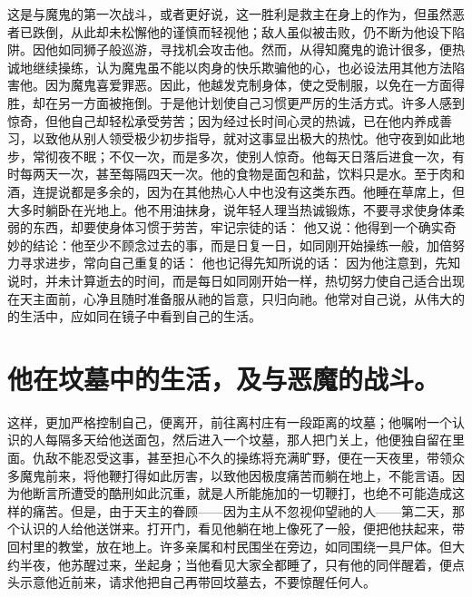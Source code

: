 这是与魔鬼的第一次战斗，或者更好说，这一胜利是救主在身上的作为，但虽然恶者已跌倒，从此却未松懈他的谨慎而轻视他；敌人虽似被击败，仍不断为他设下陷阱。因他如同狮子般巡游，寻找机会攻击他。然而，从得知魔鬼的诡计很多，便热诚地继续操练，认为魔鬼虽不能以肉身的快乐欺骗他的心，也必设法用其他方法陷害他。因为魔鬼喜爱罪恶。因此，他越发克制身体，使之受制服，以免在一方面得胜，却在另一方面被拖倒。于是他计划使自己习惯更严厉的生活方式。许多人感到惊奇，但他自己却轻松承受劳苦；因为经过长时间心灵的热诚，已在他内养成善习，以致他从别人领受极少初步指导，就对这事显出极大的热忱。他守夜到如此地步，常彻夜不眠；不仅一次，而是多次，使别人惊奇。他每天日落后进食一次，有时每两天一次，甚至每隔四天一次。他的食物是面包和盐，饮料只是水。至于肉和酒，连提说都是多余的，因为在其他热心人中也没有这类东西。他睡在草席上，但大多时躺卧在光地上。他不用油抹身，说年轻人理当热诚锻炼，不要寻求使身体柔弱的东西，却要使身体习惯于劳苦，牢记宗徒的话： 他又说：他得到一个确实奇妙的结论：他至少不顾念过去的事，而是日复一日，如同刚开始操练一般，加倍努力寻求进步，常向自己重复的话： 他也记得先知所说的话： 因为他注意到，先知说时，并未计算逝去的时间，而是每日如同刚开始一样，热切努力使自己适合出现在天主面前，心净且随时准备服从祂的旨意，只归向祂。他常对自己说，从伟大的的生活中，应如同在镜子中看到自己的生活。\par


\section{他在坟墓中的生活，及与恶魔的战斗。}

这样，更加严格控制自己，便离开，前往离村庄有一段距离的坟墓；他嘱咐一个认识的人每隔多天给他送面包，然后进入一个坟墓，那人把门关上，他便独自留在里面。仇敌不能忍受这事，甚至担心不久的操练将充满旷野，便在一天夜里，带领众多魔鬼前来，将他鞭打得如此厉害，以致他因极度痛苦而躺在地上，不能言语。因为他断言所遭受的酷刑如此沉重，就是人所能施加的一切鞭打，也绝不可能造成这样的痛苦。但是，由于天主的眷顾——因为主从不忽视仰望祂的人——第二天，那个认识的人给他送饼来。打开门，看见他躺在地上像死了一般，便把他扶起来，带回村里的教堂，放在地上。许多亲属和村民围坐在旁边，如同围绕一具尸体。但大约半夜，他苏醒过来，坐起身；当他看见大家全都睡了，只有他的同伴醒着，便点头示意他近前来，请求他把自己再带回坟墓去，不要惊醒任何人。\par

